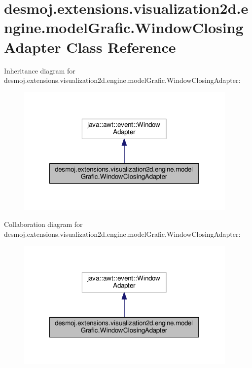 \section{desmoj.\-extensions.\-visualization2d.\-engine.\-model\-Grafic.\-Window\-Closing\-Adapter Class Reference}
\label{classdesmoj_1_1extensions_1_1visualization2d_1_1engine_1_1model_grafic_1_1_window_closing_adapter}


Inheritance diagram for desmoj.\-extensions.\-visualization2d.\-engine.\-model\-Grafic.\-Window\-Closing\-Adapter\-:
\nopagebreak
\begin{figure}[H]
\begin{center}
\leavevmode
\includegraphics[width=306pt]{classdesmoj_1_1extensions_1_1visualization2d_1_1engine_1_1model_grafic_1_1_window_closing_adapter__inherit__graph}
\end{center}
\end{figure}


Collaboration diagram for desmoj.\-extensions.\-visualization2d.\-engine.\-model\-Grafic.\-Window\-Closing\-Adapter\-:
\nopagebreak
\begin{figure}[H]
\begin{center}
\leavevmode
\includegraphics[width=306pt]{classdesmoj_1_1extensions_1_1visualization2d_1_1engine_1_1model_grafic_1_1_window_closing_adapter__coll__graph}
\end{center}
\end{figure}

